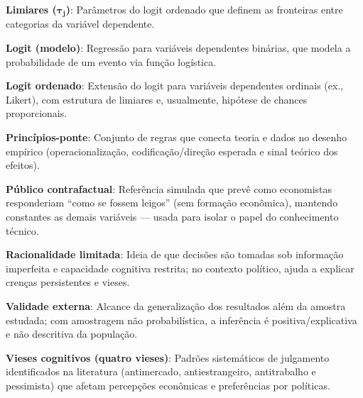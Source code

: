 {\textbf{Limiares ($\boldsymbol{\tau_j}$)}: Parâmetros do logit ordenado que definem as fronteiras entre categorias da variável dependente.

\textbf{Logit (modelo)}: Regressão para variáveis dependentes binárias, que modela a probabilidade de um evento via função logística.

\textbf{Logit ordenado}: Extensão do logit para variáveis dependentes ordinais (ex., Likert), com estrutura de limiares e, usualmente, hipótese de chances proporcionais.

\textbf{Princípios-ponte}: Conjunto de regras que conecta teoria e dados no desenho empírico (operacionalização, codificação/direção esperada e sinal teórico dos efeitos).

\textbf{Público contrafactual}: Referência simulada que prevê como economistas responderiam “como se fossem leigos” (sem formação econômica), mantendo constantes as demais variáveis — usada para isolar o papel do conhecimento técnico.

\textbf{Racionalidade limitada}: Ideia de que decisões são tomadas sob informação imperfeita e capacidade cognitiva restrita; no contexto político, ajuda a explicar crenças persistentes e vieses.

\textbf{Validade externa}: Alcance da generalização dos resultados além da amostra estudada; com amostragem não probabilística, a inferência é positiva/explicativa e não descritiva da população.

\textbf{Vieses cognitivos (quatro vieses)}: Padrões sistemáticos de julgamento identificados na literatura (antimercado, antiestrangeiro, antitrabalho e pessimista) que afetam percepções econômicas e preferências por políticas.

} %



